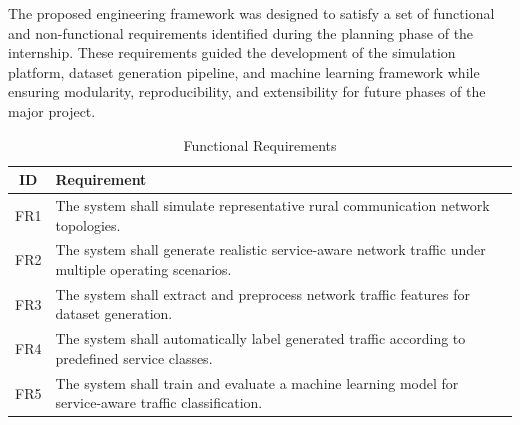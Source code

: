 \documentclass[12pt,a4paper]{report}
\begin{document}
	The proposed engineering framework was designed to satisfy a set of functional and non-functional requirements identified during the planning phase of the internship. These requirements guided the development of the simulation platform, dataset generation pipeline, and machine learning framework while ensuring modularity, reproducibility, and extensibility for future phases of the major project.
	\begin{table}[H]
		\centering
		\caption{Functional Requirements}
		\label{tab:functional_requirements}
		
		\begin{tabular}{|c|p{10.5cm}|}
			\hline
			
			\textbf{ID} &
			\textbf{Requirement}
			\\
			\hline
			
			FR1 &
			The system shall simulate representative rural communication network topologies.
			\\
			\hline
			
			FR2 &
			The system shall generate realistic service-aware network traffic under multiple operating scenarios.
			\\
			\hline
			
			FR3 &
			The system shall extract and preprocess network traffic features for dataset generation.
			\\
			\hline
			
			FR4 &
			The system shall automatically label generated traffic according to predefined service classes.
			\\
			\hline
			
			FR5 &
			The system shall train and evaluate a machine learning model for service-aware traffic classification.
			\\
			\hline
			
		\end{tabular}
		
	\end{table}
	
\end{document}
